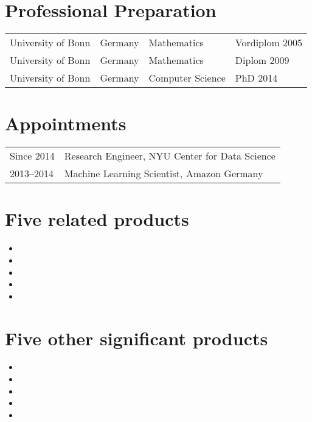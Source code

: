 

\section*{Professional Preparation}
\begin{tabular}{l l l l}
University of Bonn& Germany& Mathematics     &  Vordiplom 2005\\
University of Bonn& Germany& Mathematics     &  Diplom 2009\\
University of Bonn& Germany& Computer Science&  PhD 2014\\
\end{tabular}

\section*{Appointments}
\begin{tabular}{l l}
Since 2014& Research Engineer, NYU Center for Data Science\\
2013--2014& Machine Learning Scientist, Amazon Germany\\
\end{tabular}

\section*{Five related products}
\begin{itemize}
    \item {}  %
    \item {}            %
    \item {} %
    \item {}             %
    \item {}
\end{itemize}

\section*{Five other significant products}
\begin{itemize}
    \item {}
    \item {}
    \item {}
    \item {}
    \item {}
\end{itemize}

